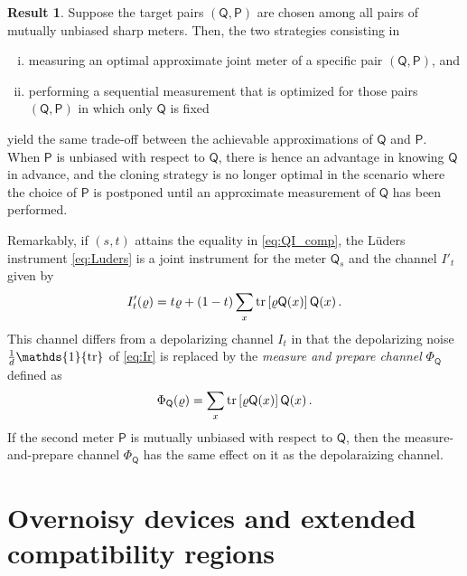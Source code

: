 \documentclass[12pt,reqno]{amsart}
\theoremstyle{definition}
\newcommand{\tr}[1]{{\rm tr}\left[#1\right]} %
\newcommand{\id}{\mathds{1}} %
\newcommand{\Qo}{\mathsf{Q}}%
\newcommand{\Po}{\mathsf{P}}%
\newtheorem{result}{Result}
\newcommand{\rhoo}{\varrho} %
\begin{document}
\begin{result}\label{res:2}
Suppose the target pairs $(\Qo,\Po)$ are chosen among all pairs of mutually unbiased sharp meters. Then, the two strategies consisting in
\begin{enumerate}[(i)]
\item measuring an optimal approximate joint meter of a specific pair $(\Qo,\Po)$, and
\item performing a sequential measurement that is optimized for those pairs $(\Qo,\Po)$ in which only $\Qo$ is fixed
\end{enumerate}
yield the same trade-off between the achievable approximations of $\Qo$ and $\Po$. When $\Po$ is unbiased with respect to $\Qo$, there is hence an advantage in knowing $\Qo$ in advance, and the cloning strategy is no longer optimal in the scenario where the choice of $\Po$ is postponed until an approximate measurement of $\Qo$ has been performed.
\end{result}

Remarkably, if $(s,t)$ attains the equality in \eqref{eq:QI_comp}, the L\"uders instrument \eqref{eq:Luders} is a joint instrument for the meter $\Qo_s$ and the channel $I'_t$ given by
\begin{equation} %
I'_t(\rhoo) = t\rhoo + (1-t) \sum_x \tr{\rhoo\Qo(x)} \Qo(x)\,.
\end{equation}
This channel differs from a depolarizing channel $I_t$ in that the depolarizing noise $\tfrac{1}{d}\id {\rm tr}$ of \eqref{eq:Ir} is replaced by the {\em measure and prepare channel} $\Phi_\Qo$ defined as
\begin{equation} %
\Phi_\Qo(\rhoo) = \sum_x \tr{\rhoo\Qo(x)} \Qo(x) \,.
\end{equation}
If the second meter $\Po$ is mutually unbiased with respect to $\Qo$, then the measure-and-prepare channel $\Phi_\Qo$ has the same effect on it as the depolaraizing channel.


\section{Overnoisy devices and extended compatibility regions}\label{sec:exceptional}
\end{document}
